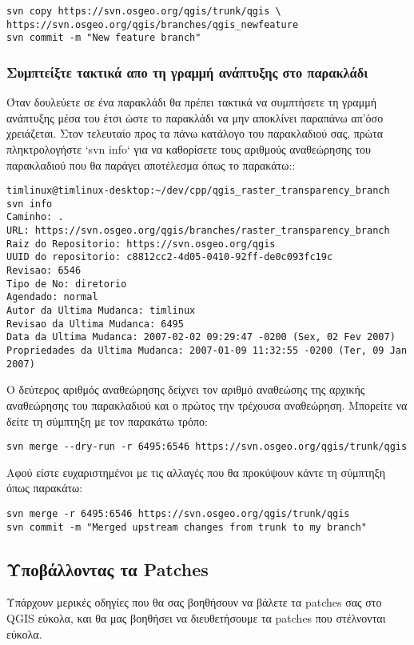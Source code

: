 \begin{verbatim}
svn copy https://svn.osgeo.org/qgis/trunk/qgis \
https://svn.osgeo.org/qgis/branches/qgis_newfeature
svn commit -m "New feature branch"
\end{verbatim}

\hypertarget{toc38}{}
\subsubsection{Συμπτείξτε τακτικά απο τη γραμμή ανάπτυξης στο παρακλάδι}
Όταν δουλεύετε σε ένα παρακλάδι θα πρέπει τακτικά να συμπτήσετε τη γραμμή ανάπτυξης μέσα του έτσι ώστε το παρακλάδι να μην αποκλίνει παραπάνω απ'όσο χρειάζεται. Στον τελευταίο προς τα πάνω κατάλογο του παρακλαδιού σας, πρώτα πληκτρολογήστε ‘svn info‘ για να καθορίσετε τους αριθμούς αναθεώρησης του παρακλαδιού που θα παράγει αποτέλεσμα όπως το παρακάτω::

\begin{verbatim}
timlinux@timlinux-desktop:~/dev/cpp/qgis_raster_transparency_branch svn info
Caminho: .
URL: https://svn.osgeo.org/qgis/branches/raster_transparency_branch
Raiz do Repositorio: https://svn.osgeo.org/qgis
UUID do repositorio: c8812cc2-4d05-0410-92ff-de0c093fc19c
Revisao: 6546
Tipo de No: diretorio
Agendado: normal
Autor da Ultima Mudanca: timlinux
Revisao da Ultima Mudanca: 6495
Data da Ultima Mudanca: 2007-02-02 09:29:47 -0200 (Sex, 02 Fev 2007)
Propriedades da Ultima Mudanca: 2007-01-09 11:32:55 -0200 (Ter, 09 Jan 2007)
\end{verbatim}

Ο δεύτερος αριθμός αναθεώρησης δείχνει τον αριθμό αναθεώσης της αρχικής αναθεώρησης του παρακλαδιού και ο πρώτος την τρέχουσα αναθεώρηση. Μπορείτε να δείτε τη σύμπτηξη με τον παρακάτω τρόπο:

\begin{verbatim}
svn merge --dry-run -r 6495:6546 https://svn.osgeo.org/qgis/trunk/qgis
\end{verbatim}

Αφού είστε ευχαριστημένοι με τις αλλαγές που θα προκύψουν κάντε τη σύμπτηξη όπως παρακάτω:

\begin{verbatim}
svn merge -r 6495:6546 https://svn.osgeo.org/qgis/trunk/qgis
svn commit -m "Merged upstream changes from trunk to my branch"
\end{verbatim}

\hypertarget{toc39}{}
\subsection{Υποβάλλοντας τα Patches}
Υπάρχουν μερικές οδηγίες που θα σας βοηθήσουν να βάλετε τα patches σας στο QGIS εύκολα, και θα μας βοηθήσει να διευθετήσουμε τα patches που στέλνονται εύκολα.

